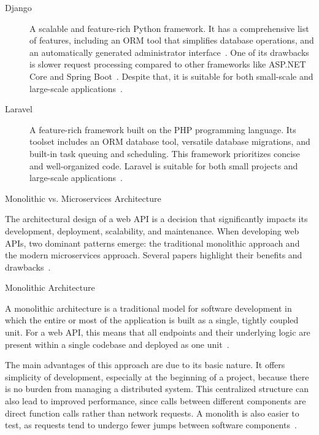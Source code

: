 \documentclass[12pt, reqno, oneside]{amsbook}
\makeatletter
\def\section{\@startsection{section}{1}%
      \z@{.5\linespacing\@plus.7\linespacing}{.25\linespacing}%
      {\normalfont\bfseries\flushleft}}
\def\subsection{\@startsection{subsection}{2}%
      \z@{.5\linespacing\@plus.7\linespacing}{.25\linespacing}%
      {\normalfont\bfseries\flushleft}}
\theoremstyle{definition}
\theoremstyle{definition}
\numberwithin{section}{chapter}
\numberwithin{table}{chapter}
\numberwithin{figure}{chapter}
\makeatother
\begin{document}
\begin{description}
  \item [Django] A scalable and feature-rich Python framework. It has a comprehensive list of features, including an \ac{ORM} tool that simplifies database operations, and an automatically generated administrator interface~\cite{Mozilla, Zanevych2024, Chen2017}. One of its drawbacks is slower request processing compared to other frameworks like ASP.NET Core and Spring Boot~\cite{Haque2022, Choma2023}. Despite that, it is suitable for both small-scale and large-scale applications~\cite{Mozilla, Zanevych2024}.
  \item [Laravel] A feature-rich framework built on the PHP programming language. Its toolset includes an \ac{ORM} database tool, versatile database migrations, and built-in task queuing and scheduling. This framework prioritizes concise and well-organized code. Laravel is suitable for both small projects and large-scale applications~\cite{Mozilla, Madurapperuma2022, Nguyen2022}.
\end{description}

\pagebreak

\section{Monolithic vs. Microservices Architecture}
\label{Section:Monolithic_vs_Microservices_Architecture}

The architectural design of a web \ac{API} is a decision that significantly impacts its development, deployment, scalability, and maintenance. When developing web \acp{API}, two dominant patterns emerge: the traditional monolithic approach and the modern microservices approach. Several papers highlight their benefits and drawbacks~\cite{Huf2019, Taibi2018, Adrio2023, Moysiadis2022}.

\subsection{Monolithic Architecture}
\label{Subsection:Monolithic_Architecture}

A monolithic architecture is a traditional model for software development in which the entire or most of the application is built as a single, tightly coupled unit. For a web \ac{API}, this means that all endpoints and their underlying logic are present within a single codebase and deployed as one unit~\cite{Taibi2018, Adrio2023, Moysiadis2022, Figueira2024, Kenan2020, Yoo2025}.

The main advantages of this approach are due to its basic nature. It offers simplicity of development, especially at the beginning of a project, because there is no burden from managing a distributed system. This centralized structure can also lead to improved performance, since calls between different components are direct function calls rather than network requests. A monolith is also easier to test, as requests tend to undergo fewer jumps between software components~\cite{Taibi2018, Adrio2023, Moysiadis2022, Figueira2024, Kenan2020, Blinowski2022}.
\end{document}
